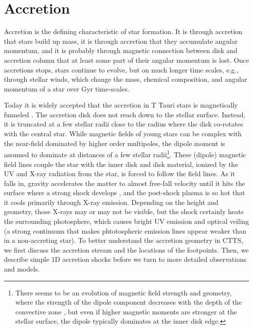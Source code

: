 


\section{Accretion \label{sect:accretion}}

Accretion is the defining characteristic of star formation. It is through accretion that stars build up mass, it is through accretion that they accumulate angular momentum, and it is probably through magnetic connection between disk and accretion column that at least some part of their angular momentum is lost. Once accretions stops, stars continue to evolve, but on much longer time scales, e.g., through stellar winds, which change the mass, chemical composition, and angular momentum of a star over Gyr time-scales.

Today it is widely accepted that the accretion in T Tauri stars is magnetically funneled \citep{Hartmann_2016}. The accretion disk does not reach down to the stellar surface. Instead, it is truncated at a few stellar radii close to the radius where the disk co-rotates with the central star. While magnetic fields of young stars can be complex with the near-field dominated by higher order multipoles, the dipole moment is assumed to dominate at distances of a few stellar radii\footnote{There seems to be an evolution of magnetic field strength and geometry, where the strength of the dipole component decreases with the depth of the convective zone \cite{2012ApJ...755...97G,2019A&A...622A..72V}, but even if higher magnetic moments are stronger at the stellar surface, the dipole typically dominates at the inner disk edge.}. These (dipole) magnetic field lines couple the star with the inner disk and disk material, ionized by the UV and X-ray radiation from the star, is forced to follow the field lines. As it falls in, gravity accelerates the matter to almost free-fall velocity until it hits the surface where a strong shock develops \cite{Shu_1994}, and the post-shock plasma is so hot that it cools primarily through X-ray emission.  Depending on the height and geometry, those X-rays may or may not be visible, but the shock certainly heats the surrounding photosphere, which causes bright UV emission and optical veiling (a strong continuum that makes phtotospheric emission lines appear weaker than in a non-accreting star). To better understand the accretion geometry in CTTS, we first discuss the accretion stream and the locations of the footpoints. Then, we describe simple 1D accretion shocks before we turn to more detailed observations and models.

